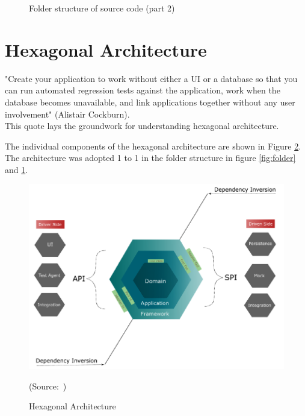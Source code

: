         \begin{figure}[h]
            \caption{Folder structure of source code (part 2)}
            \label{fig:folder_2}
        \end{figure}
        \newpage

    \section{Hexagonal Architecture} \label{sec:hex-architecture}
        "Create your application to work without either a UI or a database so that you can run automated regression tests against the application, work when the database becomes unavailable, and link applications together without any user involvement" (Alistair Cockburn). \\
        This quote lays the groundwork for understanding hexagonal architecture.

        The individual components of the hexagonal architecture are shown in Figure \ref{fig:hex-architecture}. The architecture was adopted 1 to 1 in the folder structure in figure \ref{fig:folder} and  \ref{fig:folder_2}. 

        \begin{figure}[h]
            \centering
            \includegraphics[scale=0.75]{images/hex-architecture.png}
            \caption{Hexagonal Architecture}
            \mbox{(Source: \autocite[][p.13]{hexagonal_architecture})}
            \label{fig:hex-architecture}
        \end{figure}

